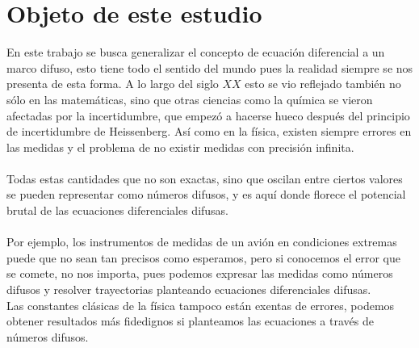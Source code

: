 \section{Objeto de este estudio}
En este trabajo se busca generalizar el concepto de ecuación diferencial a un marco difuso, esto tiene todo el sentido del mundo pues la realidad siempre se nos presenta de esta forma. A lo largo del siglo $XX$ esto se vio reflejado también no sólo en las matemáticas, sino que otras ciencias como la química se vieron afectadas por la incertidumbre, que empezó a hacerse hueco después del principio de incertidumbre de Heissenberg. Así como en la física, existen siempre errores en las medidas y el problema de no existir medidas con precisión infinita. \\ \\
Todas estas cantidades que no son exactas, sino que oscilan entre ciertos valores se pueden representar como números difusos, y es aquí donde florece el potencial brutal de las ecuaciones diferenciales difusas. \\ \\
Por ejemplo, los instrumentos de medidas de un avión en condiciones extremas puede que no sean tan precisos como esperamos, pero si conocemos el error que se comete, no nos importa, pues podemos expresar las medidas como números difusos y resolver trayectorias planteando ecuaciones diferenciales difusas. \\
Las constantes clásicas de la física tampoco están exentas de errores, podemos obtener resultados más fidedignos si planteamos las ecuaciones a través de números difusos. \\ \\
